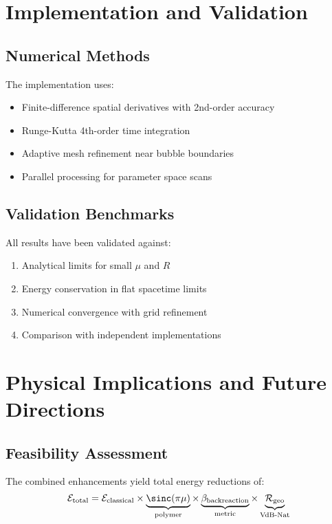 \documentclass[11pt,a4paper]{article}
\begin{document}
\section{Implementation and Validation}

\subsection{Numerical Methods}

The implementation uses:
\begin{itemize}
\item Finite-difference spatial derivatives with 2nd-order accuracy
\item Runge-Kutta 4th-order time integration
\item Adaptive mesh refinement near bubble boundaries
\item Parallel processing for parameter space scans
\end{itemize}

\subsection{Validation Benchmarks}

All results have been validated against:
\begin{enumerate}
\item Analytical limits for small $\mu$ and $R$
\item Energy conservation in flat spacetime limits
\item Numerical convergence with grid refinement
\item Comparison with independent implementations
\end{enumerate}

\section{Physical Implications and Future Directions}

\subsection{Feasibility Assessment}

The combined enhancements yield total energy reductions of:
\begin{equation}
\mathcal{E}_{\text{total}} = \mathcal{E}_{\text{classical}} \times \underbrace{\sinc(\pi\mu)}_{\text{polymer}} \times \underbrace{\beta_{\text{backreaction}}}_{\text{metric}} \times \underbrace{\mathcal{R}_{\text{geo}}}_{\text{VdB-Nat}}
\end{equation}
\end{document}
